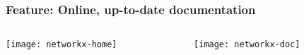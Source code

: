 \documentclass[xcolor=dvipsnames, 9pt]{beamer}
\begin{document}
\begin{frame}
\frametitle{Feature: Online, up-to-date documentation}
\begin{columns}[T]
\begin{column}{0.5\textwidth}
\centerline{\texttt{[image: networkx-home]}}
\end{column}
\begin{column}{0.5\textwidth}
\centerline{\texttt{[image: networkx-doc]}}
\end{column}
\end{columns}
\end{frame}















\end{document}
